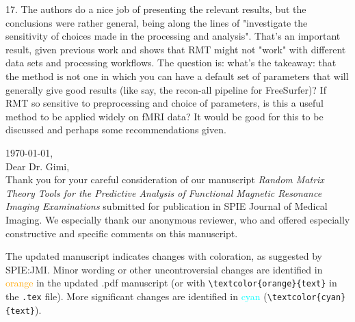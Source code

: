 \documentclass[10pt,letter]{article}
\begin{document}
{%





17. The authors do a nice job of presenting the relevant results, but the
conclusions were rather general, being along the lines of "investigate the
sensitivity of choices made in the processing and analysis". That's an
important result, given previous work and shows that RMT might not "work" with
different data sets and processing workflows. The question is: what's the
takeaway: that the method is not one in which you can have a default set of
parameters that will generally give good results (like say, the recon-all
pipeline for FreeSurfer)? If RMT so sensitive to preprocessing and choice of
parameters, is this a useful method to be applied widely on fMRI data? It would
be good for this to be discussed and perhaps some recommendations given.
}

\noindent
\today, \\
Dear Dr. Gimi, \\

Thank you for your careful consideration of our manuscript
\emph{Random Matrix Theory Tools for the Predictive Analysis of Functional
Magnetic Resonance Imaging Examinations} submitted for publication in SPIE
Journal of Medical Imaging. We especially thank our anonymous reviewer,
who and offered especially constructive and specific comments on this manuscript.

The updated manuscript indicates changes with coloration, as suggested by
SPIE:JMI. Minor wording or other uncontroversial changes are identified in
\textcolor{orange}{orange} in the updated .pdf manuscript (or with
\verb|\textcolor{orange}{text}| in the \texttt{.tex} file). More significant
changes are identified in \textcolor{cyan}{cyan} (\verb|\textcolor{cyan}{text}|).
\end{document}
